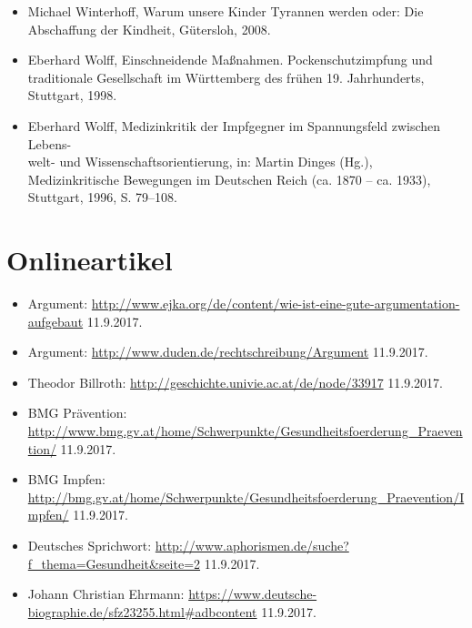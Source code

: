 \documentclass[
    a4paper,
    12pt,
    hyphens,
    chapterprefix=true,
    headheight=33pt,
    footheight=29pt,
    headings=optiontohead,
]{scrartcl}
\begin{document}
{\begin{itemize}
\item{Michael Winterhoff, Warum unsere Kinder Tyrannen werden oder: Die Abschaffung der Kindheit, Gütersloh, 2008.}
\item{Eberhard Wolff, Einschneidende Maßnahmen. Pockenschutzimpfung und traditionale Gesellschaft im Württemberg des frühen 19. Jahrhunderts, Stuttgart, 1998.}
\item{Eberhard Wolff, Medizinkritik der Impfgegner im Spannungsfeld zwischen Lebens-\\welt- und Wissenschaftsorientierung, in: Martin Dinges (Hg.), Medizinkritische Bewegungen im Deutschen Reich (ca. 1870 -- ca. 1933), Stuttgart, 1996, S. 79--108.}
\end{itemize}


\newpage

\section{Onlineartikel}

\begin{itemize}
\item{Argument: \url{http://www.ejka.org/de/content/wie-ist-eine-gute-argumentation-aufgebaut} 11.9.2017.}
\item{Argument: \url{http://www.duden.de/rechtschreibung/Argument} 11.9.2017.}
\item{Theodor Billroth: \url{http://geschichte.univie.ac.at/de/node/33917} 11.9.2017.}
\item{BMG Prävention: \url{http://www.bmg.gv.at/home/Schwerpunkte/Gesundheitsfoerderung_Praevention/} 11.9.2017.}
\item{BMG Impfen: \url{http://bmg.gv.at/home/Schwerpunkte/Gesundheitsfoerderung_Praevention/Impfen/} 11.9.2017.}
\item{Deutsches Sprichwort: \url{http://www.aphorismen.de/suche?f_thema=Gesundheit&seite=2} 11.9.2017.}
\item{Johann Christian Ehrmann: \url{https://www.deutsche-biographie.de/sfz23255.html#adbcontent} 11.9.2017.}


\end{itemize}}
\end{document}
